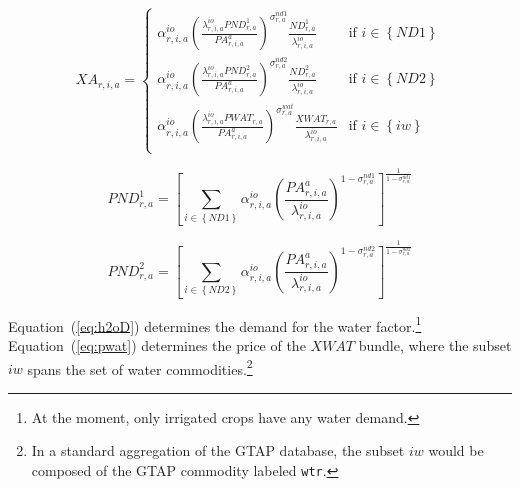 \documentclass[11pt,letterpaper]{report}
\begin{document}
\begin{equation}
\label{eq:xap}
\mathit{XA}_{r,i,a} =
\begin{cases}
   \displaystyle \alpha^{\mathit{io}}_{r,i,a}
      \left( \frac {\lambda^{\mathit{io}}_{r,i,a} \mathit{PND}^1_{r,a}}
         {\mathit{PA}^a_{r,i,a}}
      \right)^{\sigma^{\mathit{nd1}}_{r,a}}
      \frac {\mathit{ND}^1_{r,a}} {\lambda^{\mathit{io}}_{r,i,a}}
      & \textrm{if } i \in \left\{ \mathit{ND1} \right\} \\
   \displaystyle \alpha^{\mathit{io}}_{r,i,a}
      \left( \frac {\lambda^{\mathit{io}}_{r,i,a} \mathit{PND}^2_{r,a}}
         {\mathit{PA}^a_{r,i,a}}
      \right)^{\sigma^{\mathit{nd2}}_{r,a}}
      \frac {\mathit{ND}^2_{r,a}} {\lambda^{\mathit{io}}_{r,i,a}}
   & \textrm{if } i \in \left\{ \mathit{ND2} \right\} \\
   \displaystyle \alpha^{\mathit{io}}_{r,i,a}
   \left( \frac {\lambda^{\mathit{io}}_{r,i,a} \mathit{PWAT}_{r,a}}
      {\mathit{PA}^a_{r,i,a}}
   \right)^{\sigma^{\mathit{wat}}_{r,a}}
   \frac {\mathit{XWAT}_{r,a}} {\lambda^{\mathit{io}}_{r,i,a}}
   & \textrm{if } i \in \left\{ \mathit{iw} \right\} \\
\end{cases}
\end{equation}

\begin{equation}
\label{eq:pnd1}
\mathit{PND}^1_{r,a} =
   \left[
      \sum_{i \in \left\{ \mathit{ND1} \right\}} {
         \alpha^{\mathit{io}}_{r,i,a}
         \left( \frac {\mathit{PA}^a_{r,i,a}} {\lambda^{\mathit{io}}_{r,i,a}}
         \right)^{1 - \sigma^{\mathit{nd1}}_{\mathit{r,a}}}
      }
   \right]^{\frac{1} {1 - \sigma^{\mathit{nd1}}_{\mathit{r,a}}}}
\end{equation}

\begin{equation}
\label{eq:pnd2}
\mathit{PND}^2_{r,a} =
   \left[
      \sum_{i \in \left\{ \mathit{ND2} \right\}} {
         \alpha^{\mathit{io}}_{r,i,a}
         \left( \frac {\mathit{PA}^a_{r,i,a}} {\lambda^{\mathit{io}}_{r,i,a}}
         \right)^{1 - \sigma^{\mathit{nd2}}_{\mathit{r,a}}}
      }
   \right]^{\frac{1} {1 - \sigma^{\mathit{nd2}}_{\mathit{r,a}}}}
\end{equation}

Equation~(\ref{eq:h2oD}) determines the demand for the water
factor.\footnote{At the moment, only irrigated crops have any water demand.}
Equation~(\ref{eq:pwat}) determines the price of the $\mathit{XWAT}$ bundle,
where the subset $\mathit{iw}$ spans the set of water
commodities.\footnote{In a standard aggregation of the GTAP database, the
subset $\mathit{iw}$ would be composed of the GTAP commodity labeled
\texttt{wtr}.}
\end{document}
